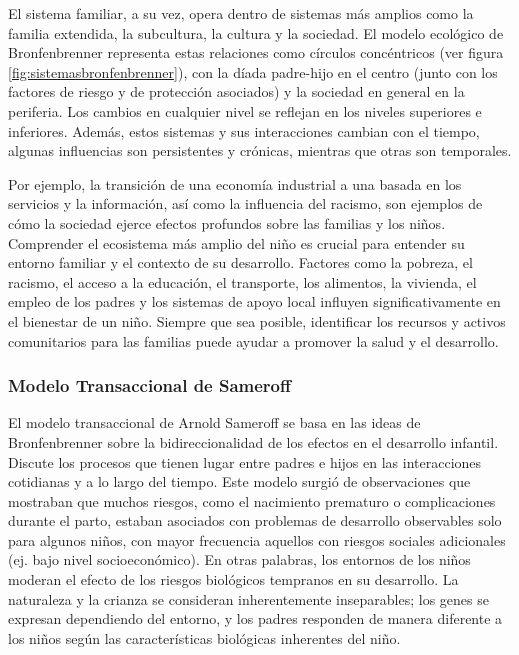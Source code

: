 \documentclass[11pt,letterpaper]{report}
\begin{document}
El sistema familiar, a su vez, opera dentro de sistemas más amplios como la 
familia extendida, la subcultura, la cultura y la sociedad. El modelo ecológico 
de Bronfenbrenner representa estas relaciones como círculos concéntricos (ver
figura \ref{fig:sistemasbronfenbrenner}), con la díada padre-hijo en el centro
(junto con los factores de riesgo y de protección asociados) y la sociedad en
general en la periferia. Los cambios en  cualquier nivel se reflejan en los
niveles superiores e inferiores. Además, estos sistemas y sus interacciones
cambian con el tiempo, algunas influencias  son persistentes y crónicas,
mientras que otras son temporales. \cite{Nelson19}

Por ejemplo, la transición de una economía industrial a una basada en los 
servicios y la información, así como la influencia del racismo, son ejemplos de
cómo la sociedad ejerce efectos profundos sobre las familias y los niños.
Comprender el ecosistema más amplio del niño es crucial para entender su 
entorno familiar y el contexto de su desarrollo. Factores como la pobreza, el 
racismo, el acceso a la educación, el transporte, los alimentos, la vivienda,
el empleo de los padres y los sistemas de apoyo local influyen
significativamente en el bienestar de un niño. Siempre que sea posible, 
identificar los recursos y activos comunitarios para las familias puede ayudar 
a promover la salud y el desarrollo. \cite{Nelson19}

\subsubsection{Modelo Transaccional de Sameroff}
El modelo transaccional de Arnold Sameroff se basa en las ideas de
Bronfenbrenner sobre la bidireccionalidad de los efectos en el desarrollo
infantil. Discute los procesos que tienen lugar entre padres e hijos en las
interacciones cotidianas y a lo largo del tiempo. Este modelo surgió de
observaciones que mostraban que muchos riesgos, como el nacimiento prematuro o
complicaciones durante el parto, estaban asociados con problemas de desarrollo
observables solo para algunos niños, con mayor frecuencia aquellos con riesgos
sociales adicionales (ej. bajo nivel socioeconómico). En otras
palabras, los entornos de los niños moderan el efecto de los riesgos
biológicos tempranos en su desarrollo. La naturaleza y la crianza se consideran
inherentemente inseparables; los genes se expresan dependiendo del entorno, y
los padres responden de manera diferente a los niños según las características
biológicas inherentes del niño. \cite{Feldman3}
\end{document}
